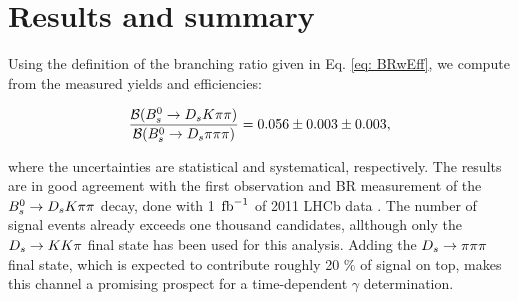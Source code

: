 \section{Results and summary}
\label{sec: results}

Using the definition of the branching ratio given in Eq. \ref{eq: BRwEff}, we compute from the measured yields and efficiencies:

\begin{equation}
\frac{\mathcal{B}({{B}^0_{s}}\rightarrow{\ensuremath{{D}_{s}}}{\ensuremath{K}}{\ensuremath{\pi}}{\ensuremath{\pi}})}{\mathcal{B}({{B}^0_{s}}\rightarrow{\ensuremath{{D}_{s}}}{\ensuremath{\pi}}{\ensuremath{\pi}}{\ensuremath{\pi}})} = 0.056 \pm 0.003 \pm 0.003,
\label{eq: resultBR}
\end{equation}

where the uncertainties are statistical and systematical, respectively. \newline
The results are in good agreement with the first observation and BR measurement of the ${{B}^0_{s}}\rightarrow{\ensuremath{{D}_{s}}}{\ensuremath{K}}{\ensuremath{\pi}}{\ensuremath{\pi}}$ decay, done with 1 $\mbox{\,fb}^{-1}$ of 2011 LHCb data \cite{Blusk:2012it}.  
The number of signal events already exceeds one thousand candidates, allthough only the ${{D}_{s}}\rightarrow{\ensuremath{K}}{\ensuremath{K}}{\ensuremath{\pi}}$ final state has been used for this analysis. 
Adding the ${{D}_{s}}\rightarrow{\ensuremath{\pi}}{\ensuremath{\pi}}{\ensuremath{\pi}}$ final state, which is expected to contribute roughly 20 $\%$ of signal on top, makes this channel a promising prospect for a time-dependent $\gamma$ determination.

